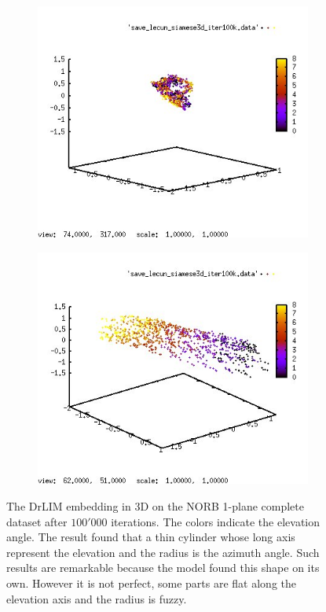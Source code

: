 \documentclass[a4paper,12pt]{report}
\begin{document}
\begin{figure}[h]
    \centering
    \begin{subfigure}{0.7\textwidth}
        \centering
        \includegraphics[width=\textwidth]{thesis_figures/norb_drlim1.jpg}
    \end{subfigure}
    \begin{subfigure}{0.7\textwidth}
        \centering
        \includegraphics[width=\textwidth]{thesis_figures/norb_drlim2.jpg}
    \end{subfigure}
    \caption{The DrLIM embedding in 3D on the NORB 1-plane complete dataset after $100'000$ iterations.
    The colors indicate the elevation angle.
    The result found that a thin cylinder whose long axis represent the elevation and the radius is the azimuth angle.
    Such results are remarkable because the model found this shape on its own.
    However it is not perfect, some parts are flat along the elevation axis and the radius is fuzzy.
    }
    \label{fig:norb_drlim_embedding}
\end{figure}
\end{document}
